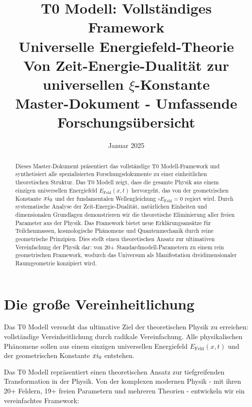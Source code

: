 \documentclass[12pt,a4paper]{report}
\title{{ T0 Modell: Vollständiges Framework}\\
		{ Universelle Energiefeld-Theorie}\\
		{\Large Von Zeit-Energie-Dualität zur universellen $\xi$-Konstante}\\
		\vspace{1cm}
		{\large Master-Dokument - Umfassende Forschungsübersicht}}
\author{}
\date{Januar 2025}
\begin{document}
	\maketitle
	
	\begin{abstract}
		Dieses Master-Dokument präsentiert das vollständige T0 Modell-Framework und synthetisiert alle spezialisierten Forschungsdokumente zu einer einheitlichen theoretischen Struktur. Das T0 Modell zeigt, dass die gesamte Physik aus einem einzigen universellen Energiefeld $E_{\text{Feld}}(x,t)$ hervorgeht, das von der geometrischen Konstante $xi_0$ und der fundamentalen Wellengleichung $\square E_{\text{Feld}} = 0$ regiert wird. Durch systematische Analyse der Zeit-Energie-Dualität, natürlichen Einheiten und dimensionalen Grundlagen demonstrieren wir die theoretische Eliminierung aller freien Parameter aus der Physik. Das Framework bietet neue Erklärungsansätze für Teilchenmassen, kosmologische Phänomene und Quantenmechanik durch reine geometrische Prinzipien. Dies stellt einen theoretischen Ansatz zur ultimativen Vereinfachung der Physik dar: von 20+ Standardmodell-Parametern zu einem rein geometrischen Framework, wodurch das Universum als Manifestation dreidimensionaler Raumgeometrie konzipiert wird.
	\end{abstract}
	
	\tableofcontents
	\listoftables
	

\maketitle
	
	\section{Die große Vereinheitlichung}
	
	\begin{revolutionaer}
		Das T0 Modell versucht das ultimative Ziel der theoretischen Physik zu erreichen: vollständige Vereinheitlichung durch radikale Vereinfachung. Alle physikalischen Phänomene sollen aus einem einzigen universellen Energiefeld $E_{\text{Feld}}(x,t)$ und der geometrischen Konstante $xi_0$ entstehen.
	\end{revolutionaer}
	
	Das T0 Modell repräsentiert einen theoretischen Ansatz zur tiefgreifenden Transformation in der Physik. Von der komplexen modernen Physik - mit ihren 20+ Feldern, 19+ freien Parametern und mehreren Theorien - entwickeln wir ein vereinfachtes Framework:
	
\end{document}
